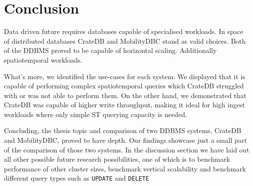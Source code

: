 \section{Conclusion}
\label{cha:conclusion}

Data driven future requires databases capable of specialised workloads.
In space of distributed databases CrateDB and MobilityDBC stand as valid choices.
Both of the DDBMS proved to be capable of horizontal scaling.
Additionally spatiotemporal workloads.

What's more, we identified the use-cases for each system.
We displayed that it is capable of performing complex spatiotemporal queries which CrateDB struggled with or was not able to perform them.
On the other hand, we demonstrated that CrateDB was capable of higher write throughput, making it ideal for high ingest workloads where only simple ST querying capacity is needed.

Concluding, the thesis topic and comparison of two DDBMS systems, CrateDB and MobilityDBC, proved to have depth.
Our findings showcase just a small part of the comparison of those two systems.
In the discussion section we have laid out all other possible future research possibilities, one of which is to benchmark performance of other cluster sizes, benchmark vertical scalability and benchmark different query types such as \verb|UPDATE| and \verb|DELETE|

